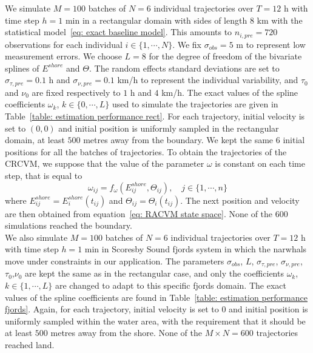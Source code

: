 \documentclass[11pt]{article}
\newcommand {\1}{\mathbb{1}}
\theoremstyle{definition}
\theoremstyle{remark}
\theoremstyle{remark}
\begin{document}
We simulate $M=100$ batches of $N=6$ individual trajectories over $T=12$ h with time step $h=1$ min in a rectangular domain with sides of length $8$ km with the statistical model~\ref{eq: exact baseline model}. This amounts to $n_{i,pre}=720$ observations for each individual $i \in \{1,\cdots,N\}$. We fix $\sigma_{obs}=5$ m to represent low measurement errors. 
We choose $L=8$ for the degree of freedom of the bivariate splines of $E^{shore}$ and $\Theta$. The random effects standard deviations are set to $\sigma_{\tau,pre}=0.1$ h and $\sigma_{\nu,pre}=0.1$ km/h to represent the individual variability, and $\tau_{0}$ and $\nu_{0}$ are fixed respectively to $1$ h and $4$ km/h. The exact values of the spline coefficients $\omega_k$, $k \in \{0,\cdots,L\}$ used to simulate the trajectories are given in Table~\ref{table: estimation performance rect}. For each trajectory, initial velocity is set to $(0,0)$ and initial position is uniformly sampled in the rectangular domain, at least $500$ metres away from the boundary. We kept the same $6$ initial positions for all the batches of trajectories. To obtain the trajectories of the CRCVM, we suppose that the value of the parameter $\omega$ is constant on each time step, that is equal to 
\begin{equation}
	\omega_{ij}=f_{\omega}(E^{shore}_{ij},\Theta_{ij}), \quad j  \in \{1,\cdots,n\}
\end{equation}
where $E^{shore}_{ij}=E^{shore}_i(t_{ij})$ and $\Theta_{ij}=\Theta_i(t_{ij})$. The next position and velocity are then obtained from equation~\ref{eq: RACVM state space}. None of the $600$ simulations reached the boundary. \\


We also simulate $M=100$ batches of $N=6$ individual trajectories over $T=12$ h with time step $h=1$ min in Scoresby Sound fjords system in which the narwhals move under constraints in our application. The parameters $\sigma_{obs}$, $L$, $\sigma_{\tau,pre}$, $\sigma_{\nu,pre}$, $\tau_{0}$,$\nu_{0}$ are kept the same as in the rectangular case, and only the coefficients $\omega_k$, $k \in \{1,\cdots,L\}$ are changed to adapt to this specific fjords domain. The exact values of the spline coefficients are found in Table~\ref{table: estimation performance fjords}.
Again, for each trajectory, initial velocity is set to $0$ and initial position is uniformly sampled within the water area, with the requirement that it should be at least $500$ metres away from the shore.  None of the $M\times N=600$ trajectories reached land.\\
\end{document}
